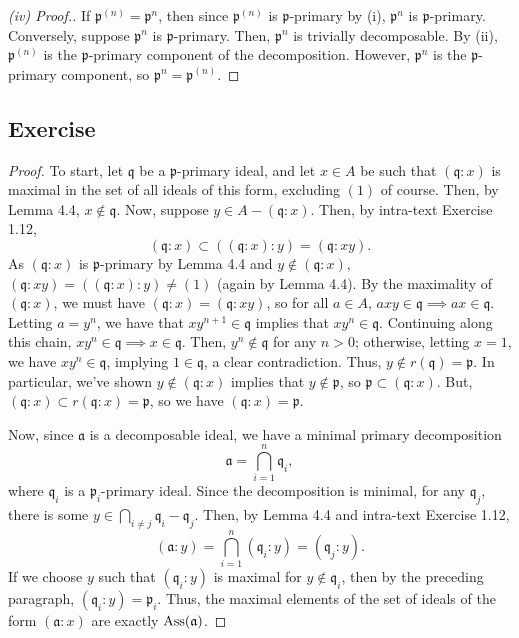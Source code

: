 \begin{proof}[(iv) Proof.]
If $\mathfrak{p}^{(n)} = \mathfrak{p}^n$, then since $\mathfrak{p}^{(n)}$ is $\mathfrak{p}$-primary by (i), $\mathfrak{p}^n$ is $\mathfrak{p}$-primary. Conversely, suppose
$\mathfrak{p}^n$ is $\mathfrak{p}$-primary. Then, $\mathfrak{p}^n$ is trivially decomposable. By (ii), $\mathfrak{p}^{(n)}$ is the $\mathfrak{p}$-primary component of the decomposition.
However, $\mathfrak{p}^n$ is the $\mathfrak{p}$-primary component, so $\mathfrak{p}^n = \mathfrak{p}^{(n)}$.
\end{proof}

\subsection{Exercise}\label{4.14}

\begin{proof}
To start, let $\mathfrak{q}$ be a $\mathfrak{p}$-primary ideal, and let $x \in A$ be such that $(\mathfrak{q}:x)$ is maximal in the set of all ideals of this form, excluding $(1)$ of course.
Then, by Lemma 4.4, $x \not\in \mathfrak{q}$. Now, suppose $y \in A - (\mathfrak{q}:x)$. Then, by intra-text Exercise 1.12,
$$(\mathfrak{q}:x) \subset ((\mathfrak{q}:x):y) = (\mathfrak{q}:xy).$$
As $(\mathfrak{q}:x)$ is $\mathfrak{p}$-primary by Lemma 4.4 and $y \not\in (\mathfrak{q}:x)$, $(\mathfrak{q}:xy) = ((\mathfrak{q}:x):y) \neq (1)$ (again by Lemma 4.4). By the maximality of
$(\mathfrak{q}:x)$, we must have $(\mathfrak{q}:x) = (\mathfrak{q}:xy)$, so for all $a \in A$, $axy \in \mathfrak{q} \implies ax \in \mathfrak{q}$. Letting $a = y^n$, we have that
$xy^{n+1} \in \mathfrak{q}$ implies that $xy^n \in \mathfrak{q}$. Continuing along this chain, $xy^n \in \mathfrak{q} \implies x \in \mathfrak{q}$. Then, $y^n \not\in \mathfrak{q}$ for any
$n > 0$; otherwise, letting $x = 1$, we have $xy^n \in \mathfrak{q}$, implying $1 \in \mathfrak{q}$, a clear contradiction. Thus, $y \not\in r(\mathfrak{q}) = \mathfrak{p}$. In particular, we've
shown $y \not\in (\mathfrak{q}:x)$ implies that $y \not\in \mathfrak{p}$, so $\mathfrak{p} \subset (\mathfrak{q}:x)$. But, $(\mathfrak{q}:x) \subset r(\mathfrak{q}:x) = \mathfrak{p}$, so we have
$(\mathfrak{q}:x) = \mathfrak{p}$.

Now, since $\mathfrak{a}$ is a decomposable ideal, we have a minimal primary decomposition
$$\mathfrak{a} = \bigcap_{i=1}^n \mathfrak{q}_i,$$
where $\mathfrak{q}_i$ is a $\mathfrak{p}_i$-primary ideal. Since the decomposition is minimal, for any $\mathfrak{q}_j$, there is some $y \in \bigcap_{i\neq j}\mathfrak{q}_i - \mathfrak{q}_j$. Then,
by Lemma 4.4 and intra-text Exercise 1.12,
$$(\mathfrak{a}:y) = \bigcap_{i=1}^n (\mathfrak{q}_i:y) = (\mathfrak{q}_j:y).$$
If we choose $y$ such that $(\mathfrak{q}_i:y)$ is maximal for $y \not\in \mathfrak{q}_i$, then by the preceding paragraph, $(\mathfrak{q}_i:y) = \mathfrak{p}_i$. Thus, the maximal elements of the set of 
ideals of the form $(\mathfrak{a}:x)$ are exactly $\operatorname{Ass}(\mathfrak{a})$.
\end{proof}

